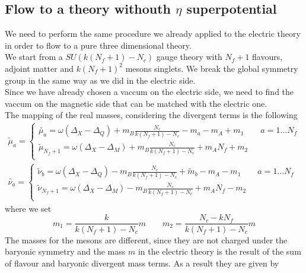\subsection{Flow to a theory withouth $\eta$ superpotential}
We need to perform the same procedure we already applied to the electric theory in order to flow to a pure three dimensional theory.\\
We start from a $SU( k(N_f +1) - N_c)$ gauge theory with $N_f +1$ flavours, adjoint matter and $k (N_f +1)^2$ mesons singlets.
We break the global symmetry group in the same way as we did in the electric side.\\
Since we have already chosen a vaccum on the electric side, we need to find the vaccum on the magnetic side that can be matched with the electric one.\\
The mapping of the real masses, considering the divergent terms is the following
\begin{equation}
\begin{aligned}
   \tilde \mu_a =
   \begin{cases}
    \tilde{ \mu_a} =  \omega ( \Delta_X - \Delta_Q ) + m_B \frac{N_c}{k(N_f +1) - N_c} - m_a  - m_A + m_1  \qquad a = 1 \dots N_f \\
    \tilde \mu_{N_f+1} =  \omega ( \Delta_X - \Delta_M ) + m_B \frac{N_c}{k(N_f +1) - N_c} +  m_A N_f + m_2    \\
   \end{cases}
   \\
   \tilde{ \nu_a} =
  \begin{cases}
  \tilde{\nu}_b = \omega ( \Delta_X - \Delta_Q ) - m_B \frac{N_c}{k(N_f +1) - N_c}  + \tilde m_b  - m_A - m_1 \qquad a = 1 \dots N_f\\
   \tilde \nu_{N_f+1} = \omega ( \Delta_X - \Delta_M ) - m_B \frac{N_c}{k(N_f +1) - N_c}  +  m_A N_f- m_2 \\
  \end{cases}
\end{aligned}
\end{equation}
where we set 
\begin{equation}
m_1  = \frac{k}{k(N_f+1)-N_c} m  \qquad
m_2  =  \frac{N_c - k N_f}{k(N_f+1)-N_c} m
\end{equation}
The masses for the mesons are different, since they are not charged under the baryonic symmetry and the mass $m$ in the electric theory is the result of the sum of flavour and baryonic divergent mass terms.
As a result they are given by
